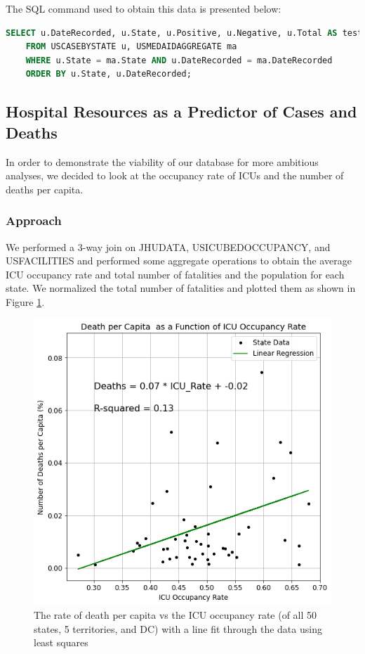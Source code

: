 \documentclass[11pt]{article}
\begin{document}
\noindent
The SQL command used to obtain this data is presented below:
\begin{lstlisting}[language=SQL,
        deletekeywords={IDENTITY,INT},
        morekeywords={clustered},    
        framesep=10pt,
        framextopmargin=10pt]
    SELECT u.DateRecorded, u.State, u.Positive, u.Negative, u.Total AS test_total, u.Death, ma.Deliveries, ma.Cost, ma.Weight
    FROM USCASEBYSTATE u, USMEDAIDAGGREGATE ma
    WHERE u.State = ma.State AND u.DateRecorded = ma.DateRecorded 
    ORDER BY u.State, u.DateRecorded;\end{lstlisting}
\pagebreak

\subsection{Hospital Resources as a Predictor of Cases and Deaths}

\noindent
In order to demonstrate the viability of our database for more ambitious analyses, we decided to look at the occupancy rate of ICUs and the number of deaths per capita. 

\subsubsection{Approach}
We performed a 3-way join on JHUDATA, USICUBEDOCCUPANCY, and USFACILITIES and performed some aggregate operations to obtain the average ICU occupancy rate and total number of fatalities and the population for each state. We normalized the total number of fatalities and plotted them as shown in Figure \ref{fig:death_pop_icu}.

\FloatBarrier
\begin{figure}[h]
    \centering
    \includegraphics[width=0.65\linewidth]{diagrams/analysis/death_icu.png}
    \caption{The rate of death per capita vs the ICU occupancy rate (of all 50 states, 5 territories, and DC) with a line fit through the data using least squares}
    \label{fig:death_pop_icu}
\end{figure}
\FloatBarrier
\end{document}
